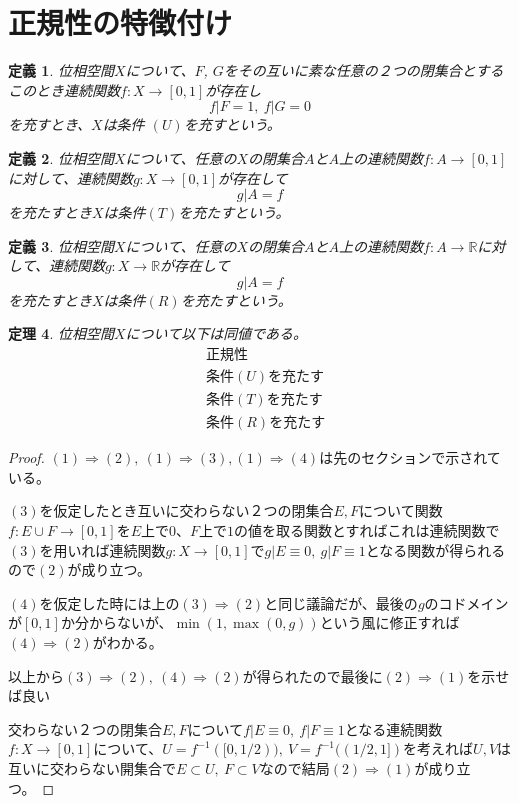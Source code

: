\documentclass[leqno]{jsarticle}
\newtheorem{thm}{定理}
\newtheorem{df}[thm]{定義}
\newcommand{\To}{\Longrightarrow}
\newcommand{\rr}{\mathbb{R}}
\begin{document}
\section{正規性の特徴付け}

\begin{df}
位相空間$X$について、$F$, $G$をその互いに素な任意の２つの閉集合とする
このとき連続関数$f:X\rightarrow [0,1]$が存在し
\[
f|F=1,\ f|G=0
\]
を充すとき、$X$は条件 $(U)$を充すという。
\end{df}

\setcounter{equation}{0}
\begin{df}
位相空間$X$について、任意の$X$の閉集合$A$と$A$上の連続関数$f:A\to [0,1]$に対して、連続関数$g:X\to [0,1]$が存在して
\[
g|A=f
\]
を充たすとき$X$は条件$(T)$を充たすという。
\end{df}

\begin{df}
位相空間$X$について、任意の$X$の閉集合$A$と$A$上の連続関数$f:A\to \rr$に対して、連続関数$g:X\to \rr$が存在して
\[
g|A=f
\]
を充たすとき$X$は条件$(R)$を充たすという。
\end{df}

\begin{thm}
位相空間$X$について以下は同値である。
\begin{align}
&\mbox{正規性}\\ 
&\mbox{条件$(U)$を充たす}\\ 
&\mbox{条件$(T)$を充たす}\\
&\mbox{条件$(R)$を充たす}
\end{align}
\end{thm}

\begin{proof}
$(1)\To (2),\ (1)\To (3),(1)\To(4)$は先のセクションで示されている。\par
$(3)$を仮定したとき互いに交わらない２つの閉集合$E,F$について関数$f:E\cup F\to [0,1]$を$E$上で$0$、$F$上で$1$の値を取る関数とすればこれは連続関数で$(3)$を用いれば連続関数$g:X\to [0,1]$で$g|E\equiv 0,\ g|F\equiv 1$となる関数が得られるので$(2)$が成り立つ。\par
$(4)$を仮定した時には上の$(3)\To(2)$と同じ議論だが、最後の$g$のコドメインが$[0,1]$か分からないが、$\min(1,\max(0,g))$という風に修正すれば$(4)\To(2)$がわかる。\par
以上から$(3)\To(2),\ (4)\To (2)$が得られたので最後に$(2)\To(1)$を示せば良い\par
交わらない２つの閉集合$E,F$について$f|E\equiv 0,\ f|F\equiv 1$となる連続関数$f:X\to [0,1]$について、$U=f^{-1}([0,1/2)),\ V=f^{-1}((1/2,1])$を考えれば$U,V$は互いに交わらない開集合で$E\subset U,\ F\subset V$なので結局$(2)\To (1)$が成り立つ。
\end{proof}
\end{document}
